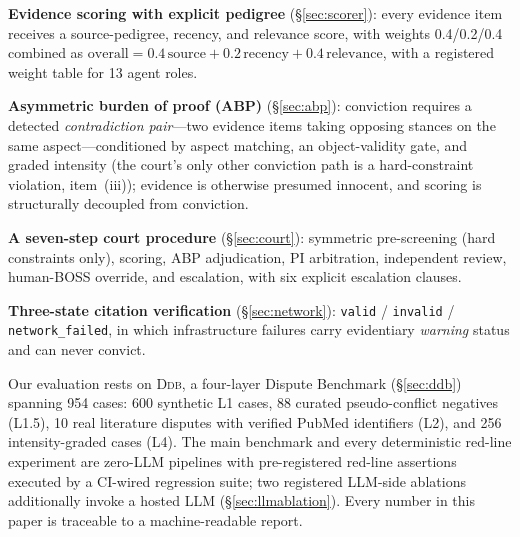 \documentclass[11pt]{article}
\newcommand{\ddb}{\textsc{Ddb}}
\begin{document}
\begin{enumerate}[leftmargin=2em,itemsep=1pt]
\begin{sloppypar}
\item \textbf{Evidence scoring with explicit pedigree}
(\S\ref{sec:scorer}): every evidence item receives a
source-pedigree, recency, and relevance score, with weights 0.4/0.2/0.4 combined as
$\mathrm{overall}=0.4\,\mathrm{source}+0.2\,\mathrm{recency}+0.4\,\mathrm{relevance}$,
with a registered weight table for 13 agent roles.
\end{sloppypar}
\item \textbf{Asymmetric burden of proof (ABP)} (\S\ref{sec:abp}):
conviction requires a detected \emph{contradiction pair}---two evidence
items taking
opposing stances on the same aspect—conditioned by aspect matching, an
object-validity gate, and graded intensity (the court's only other
conviction path is a hard-constraint violation, item~(iii)); evidence is
otherwise presumed innocent, and scoring is structurally decoupled from
conviction.
\item \textbf{A seven-step court procedure} (\S\ref{sec:court}): symmetric
pre-screening (hard constraints only), scoring, ABP adjudication, PI
arbitration, independent review, human-BOSS override, and escalation, with
six explicit escalation clauses.
\item \textbf{Three-state citation verification} (\S\ref{sec:network}):
\texttt{valid} / \texttt{invalid} / \texttt{network\_failed}, in which
infrastructure failures carry evidentiary \emph{warning} status and can
never convict.
\end{enumerate}

Our evaluation rests on \ddb{}, a four-layer Dispute Benchmark
(\S\ref{sec:ddb}) spanning 954 cases: 600 synthetic L1 cases, 88 curated
pseudo-conflict negatives (L1.5), 10 real literature disputes with verified
PubMed identifiers (L2), and 256 intensity-graded cases (L4). The main
benchmark and every deterministic red-line experiment are zero-LLM
pipelines with pre-registered red-line assertions executed by a CI-wired
regression suite; two registered LLM-side ablations additionally invoke a
hosted LLM (\S\ref{sec:llmablation}). Every number in this paper is
traceable to a machine-readable report.
\end{document}
